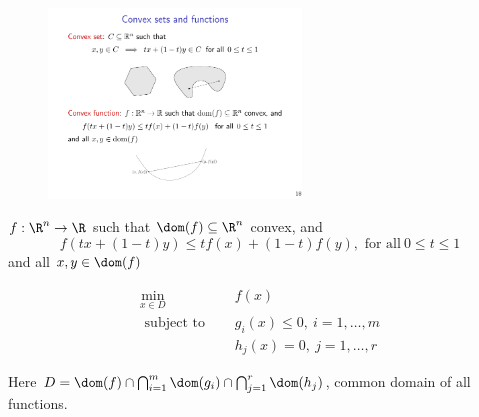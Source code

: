\documentclass[a4paper]{article}
\begin{document}
{%

\begin{figure}[htbp] 
  \centering 
  \includegraphics[width=0.6\textwidth]{img/convex_set.pdf} 
\end{figure}


\begin{defi}
    $f: \R^n \rightarrow \R$ such that $\dom (f) \subseteq \R^n$ convex, and 
    \[
        f(tx + (1-t)y) \leq tf(x) + (1-t)f(y),\text{\ for\ all}\ 0 \leq t \leq 1 
    \]
    and all $x, y \in \dom (f)$
\end{defi}

\begin{center}
\end{center}

\begin{defi} 
    \begin{align*}
        \min _{x \in D} & \quad f(x) \\
        \text { subject to } &\quad g_{i}(x) \leq 0, \ i=1, \ldots, m \\
        &\quad h_{j}(x)=0, \ j=1, \ldots, r
    \end{align*}
\end{defi}
Here $D = \dom (f) \cap \bigcap_{i=1}^{m} \dom (g_{i}) \cap \bigcap_{j=1}^{r} \dom(h_j)$, common domain of all functions.

}
\end{document}
